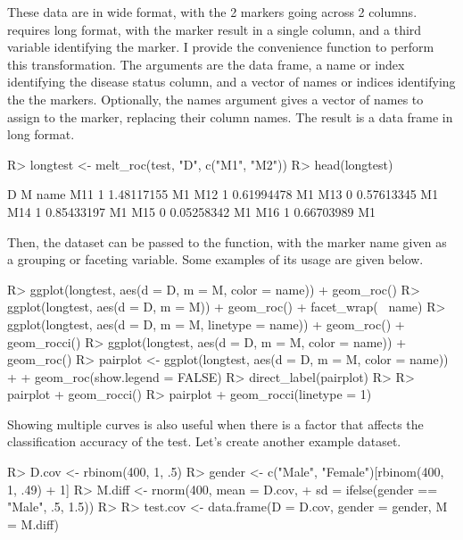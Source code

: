\documentclass[codesnippet]{jss}
\begin{document}
These data are in wide format, with the 2 markers going across 2
columns.  requires long format, with the marker result in a
single column, and a third variable identifying the marker. I provide
the convenience function  to perform this transformation.
The arguments are the data frame, a name or index identifying the
disease status column, and a vector of names or indices identifying the
the markers. Optionally, the names argument gives a vector of names to
assign to the marker, replacing their column names. The result is a data
frame in long format.

\begin{Schunk}
\begin{Sinput}
R> longtest <- melt_roc(test, "D", c("M1", "M2"))
R> head(longtest)
\end{Sinput}
\begin{Soutput}
    D          M name
M11 1 1.48117155   M1
M12 1 0.61994478   M1
M13 0 0.57613345   M1
M14 1 0.85433197   M1
M15 0 0.05258342   M1
M16 1 0.66703989   M1
\end{Soutput}
\end{Schunk}

Then, the dataset can be passed to the  function, with the
marker name given as a grouping or faceting variable. Some examples of
its usage are given below.

\begin{Schunk}
\begin{Sinput}
R> ggplot(longtest, aes(d = D, m = M, color = name)) + geom_roc()
R> ggplot(longtest, aes(d = D, m = M)) + geom_roc() + facet_wrap(~ name)
R> ggplot(longtest, aes(d = D, m = M, linetype = name)) + geom_roc() + geom_rocci()
R> ggplot(longtest, aes(d = D, m = M, color = name)) + geom_roc() 
R> pairplot <- ggplot(longtest, aes(d = D, m = M, color = name)) + 
+   geom_roc(show.legend = FALSE)
R> direct_label(pairplot)
R> 
R> pairplot + geom_rocci()
R> pairplot + geom_rocci(linetype = 1)
\end{Sinput}
\end{Schunk}

Showing multiple curves is also useful when there is a factor that
affects the classification accuracy of the test. Let's create another
example dataset.

\begin{Schunk}
\begin{Sinput}
R> D.cov <- rbinom(400, 1, .5)
R> gender <- c("Male", "Female")[rbinom(400, 1, .49) + 1]
R> M.diff <- rnorm(400, mean = D.cov, 
+                 sd = ifelse(gender == "Male", .5, 1.5))
R> 
R> test.cov <- data.frame(D = D.cov, gender = gender, M = M.diff)
\end{Sinput}
\end{Schunk}
\end{document}
